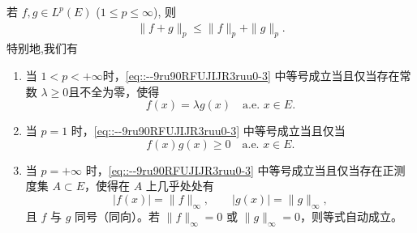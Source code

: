 \documentclass[../../main.tex]{subfiles}%
\begin{document}
\begin{theorem}[Minkowski不等式]\label{theorem:实变函数--Minkowski不等式}
若 $f,g\in L^p(E)$ ($1\leqslant p\leqslant\infty$), 则
\begin{align}\label{eq::--9ru90RFUJIJR3ruu0-3}
\|f+g\|_p \leqslant \|f\|_p + \|g\|_p.
\end{align}
特别地,我们有
\begin{enumerate}[(1)]
\item 当 $1<p<+\infty$时，\eqref{eq::--9ru90RFUJIJR3ruu0-3} 中等号成立当且仅当存在常数 $\lambda \geqslant 0$且不全为零，使得
\[
f(x)=\lambda g(x)\quad \text{a.e. } x\in E.
\]

\item 当 $p=1$ 时，\eqref{eq::--9ru90RFUJIJR3ruu0-3} 中等号成立当且仅当
\[
f(x)g(x)\geqslant 0\quad \text{a.e. } x\in E.
\]

\item 当 $p=+\infty$ 时，\eqref{eq::--9ru90RFUJIJR3ruu0-3} 中等号成立当且仅当存在正测度集 $A\subset E$，使得在 $A$ 上几乎处处有
\[
|f(x)|=\|f\|_\infty,\qquad |g(x)|=\|g\|_\infty,
\]
且 $f$ 与 $g$ 同号（同向）。若 $\|f\|_\infty=0$ 或 $\|g\|_\infty=0$，则等式自动成立。
\end{enumerate}
\end{theorem}
\end{document}
